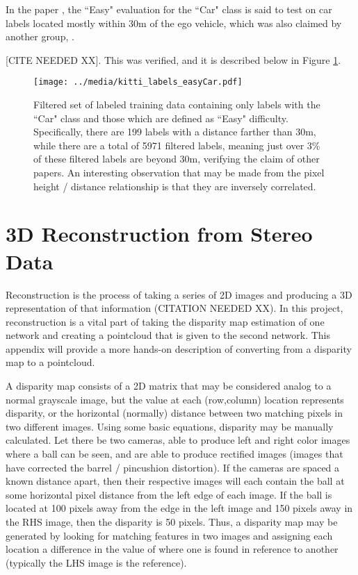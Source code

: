 In the paper \cite{wang_pseudo-lidar_2019}, the ``Easy" evaluation for the ``Car" class is said to test on car labels located mostly within 30m of the ego vehicle, which was also claimed by another group, \cite{yang_pixor:_2018}.

 [CITE NEEDED XX]. This was verified, and it is described below in Figure \ref{kitti_labels_easyCar}.

\begin{figure}[ht]
	\centering
	\texttt{[image: ../media/kitti\_labels\_easyCar.pdf]}
	\caption{Filtered set of labeled training data containing only labels with the ``Car" class and those which are defined as ``Easy" difficulty. Specifically, there are 199 labels with a distance farther than 30m, while there are a total of 5971 filtered labels, meaning just over 3\% of these filtered labels are beyond 30m, verifying the claim of other papers. An interesting observation that may be made from the pixel height / distance relationship is that they are inversely correlated.}
	\label{kitti_labels_easyCar}
\end{figure}


\newpage
\section{3D Reconstruction from Stereo Data}
\label{appendix_reconstruct}
Reconstruction is the process of taking a series of 2D images and producing a 3D representation of that information (CITATION NEEDED XX). In this project, reconstruction is a vital part of taking the disparity map estimation of one network and creating a pointcloud that is given to the second network. This appendix will provide a more hands-on description of converting from a disparity map to a pointcloud.

A disparity map consists of a 2D matrix that may be considered analog to a normal grayscale image, but the value at each (row,column) location represents disparity, or the horizontal (normally) distance between two matching pixels in two different images. Using some basic equations, disparity may be manually calculated. Let there be two cameras, able to produce left and right color images where a ball can be seen, and are able to produce rectified images (images that have corrected the barrel / pincushion distortion). If the cameras are spaced a known distance apart, then their respective images will each contain the ball at some horizontal pixel distance from the left edge of each image. If the ball is located at 100 pixels away from the edge in the left image and 150 pixels away in the RHS image, then the disparity is 50 pixels. Thus, a disparity map may be generated by looking for matching features in two images and assigning each location a difference in the value of where one is found in reference to another (typically the LHS image is the reference).

